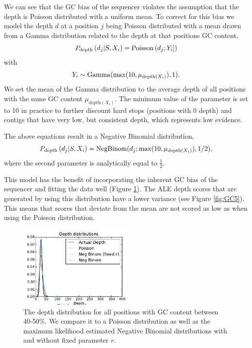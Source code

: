 \documentclass[phd,tocprelim]{cornell}
\begin{document}
We can see that the GC bias of the sequencer violates the assumption that the depth is Poisson distributed with a uniform mean. To correct for this bias we model the depth $d$ at a position $j$ being Poisson distributed with a mean drawn from a Gamma distribution related to the depth at that positions GC content,
\begin{equation}
    P_{\text{depth}}\left(d_{j}|S,X_{i}\right) = {\rm Poisson}\left(d_{j};Y_{i}]\right)
\end{equation}
with
\begin{equation}
    Y_{i} \sim {\rm Gamma}(\max(10,\mu_{\text{depth}(X_{i})}), 1).
\end{equation}
We set the mean of the Gamma distribution to the average depth of all positions with the same GC content $\mu_{\text{depth}(X_{i})}$. The minimum value of the parameter is set to 10 in practice to further discount hard stops (positions with 0 depth) and contigs that have very low, but consistent depth, which represents low evidence.

The above equations result in a Negative Binomial distribution,
\begin{equation}
    P_{\text{depth}}\left(d_{j}|S,X_{i}\right) = {\rm NegBinom}(d_{j}; \max(10, \mu_{\text{depth}(X_{i})}), 1/2),
\end{equation}
where the second parameter is analytically equal to $\frac{1}{2}$.

This model has the benefit of incorporating the inherent GC bias of the sequencer and fitting the data well (Figure \ref{fig:GC4}). The ALE depth scores that are generated by using this distribution have a lower variance (see Figure \ref{fig:GC5}). This means that scores that deviate from the mean are not scored as low as when using the Poisson distribution.

\begin{figure}[hptb]
    \centerline{\includegraphics[width=0.5\textwidth]{figures/ALE/GC_depth_distributions.png}}
    \caption[Various distributions fit to GC content]{The depth distribution for all positions with GC content between 40-50\%. We compare it to a Poisson distribution as well as the maximum likelihood estimated Negative Binomial distributions with and without fixed parameter $r$.}\label{fig:GC4}
\end{figure}
\end{document}
